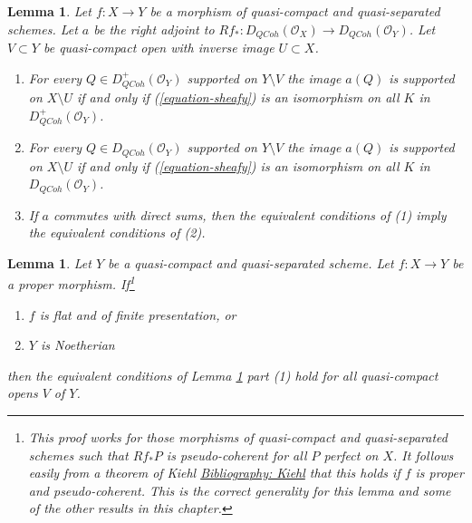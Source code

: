 \documentclass{amsart}
\theoremstyle{plain}
\newtheorem{lemma}[subsection]{Lemma}
\theoremstyle{definition}
\theoremstyle{remark}
\numberwithin{equation}{subsection}
\def\QCoh{\mathit{QCoh}}
\begin{document}
\begin{lemma}
\label{lemma-when-sheafy}
Let $f : X \to Y$ be a morphism of quasi-compact and quasi-separated
schemes. Let $a$ be the right adjoint to
$Rf_* : D_\QCoh(\mathcal{O}_X) \to D_\QCoh(\mathcal{O}_Y)$.
Let $V \subset Y$ be quasi-compact open with inverse image $U \subset X$.
\begin{enumerate}
\item For every $Q \in D_\QCoh^+(\mathcal{O}_Y)$
supported on $Y \setminus V$ the image $a(Q)$ is supported on
$X \setminus U$ if and only if (\ref{equation-sheafy})
is an isomorphism on all $K$ in $D_\QCoh^+(\mathcal{O}_Y)$.
\item For every $Q \in D_\QCoh(\mathcal{O}_Y)$
supported on $Y \setminus V$ the image $a(Q)$ is supported on
$X \setminus U$ if and only if (\ref{equation-sheafy})
is an isomorphism on all $K$ in $D_\QCoh(\mathcal{O}_Y)$.
\item If $a$ commutes with direct sums, then the equivalent conditions of
(1) imply the equivalent conditions of (2).
\end{enumerate}
\end{lemma}

\begin{lemma}
\label{lemma-proper-noetherian}
Let $Y$ be a quasi-compact and quasi-separated scheme.
Let $f : X \to Y$ be a proper morphism. If\footnote{This proof works for those
morphisms of quasi-compact and quasi-separated schemes such that
$Rf_*P$ is pseudo-coherent for all $P$ perfect on $X$. It follows
easily from a theorem of Kiehl \href{https://stacks.math.columbia.edu/bibliography}{Bibliography: Kiehl} that this holds if
$f$ is proper and pseudo-coherent. This is the correct generality
for this lemma and some of the other results in this chapter.}
\begin{enumerate}
\item $f$ is flat and of finite presentation, or
\item $Y$ is Noetherian
\end{enumerate}
then the equivalent conditions of Lemma \ref{lemma-when-sheafy} part (1)
hold for all quasi-compact opens $V$ of $Y$.
\end{lemma}
\end{document}
